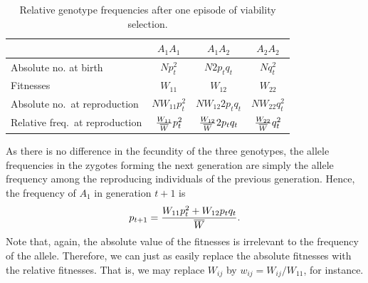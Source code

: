 \begin{table}
\begin{center}
\begin{tabular}{lccc}
\hline
& $A_1A_1$ & $A_1A_2$ & $A_2A_2$\\
\hline
Absolute no. at birth & $Np_t^2$ & $N2p_tq_t$ & $Nq_t^2$\\
Fitnesses & $W_{11}$ & $W_{12}$& $W_{22}$\\
Absolute no.\ at reproduction & $NW_{11} p_t^2$ & $NW_{12} 2p_tq_t$& $N W_{22} q_t^2$\\
Relative freq.\ at reproduction & $ \frac{W_{11}}{\overline{W}} p_{t}^2$ & $ \frac{W_{12}}{\overline{W}} 2 p_{t} q_{t}$ & $\frac{W_{22}}{\overline{W}} q_{t}^2$\\
\end{tabular}
\end{center}
\caption{Relative genotype frequencies after one episode of viability selection.} \label{dip_fitness_table}
\end{table}



As there is no difference in the fecundity of the three genotypes, the
allele frequencies in the zygotes forming the next generation are simply the
allele frequency among the reproducing individuals of the previous generation. Hence, the frequency of $A_1$ in generation $t+1$ is
\begin{equation}
	p_{t+1} = \frac{W_{11} p_t^2 + W_{12} p_tq_t}{\overline{W}}
	\label{pgen_dip}.
\end{equation}
 Note that, again, the absolute value of the fitnesses is irrelevant to
the frequency of the allele. Therefore, we can just as easily replace
the absolute fitnesses with the relative fitnesses. That is, we may replace $W_{ij}$ by $w_{ij} = W_{ij}/W_{11}$, for instance. \\


